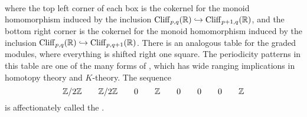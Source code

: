  \\\\\\
where the top left corner of each box is the cokernel for the monoid homomorphism
induced by the inclusion $\operatorname{Cliff}_{p,q}(\mathbb{R}) \hookrightarrow \operatorname{Cliff}_{p+1,q}(\mathbb{R})$,
and the bottom right  corner is the cokernel for the monoid homomorphism induced
by the inclusion $\operatorname{Cliff}_{p,q}(\mathbb{R}) \hookrightarrow \operatorname{Cliff}_{p,q+1}(\mathbb{R})$. There
is an analogous table for the graded modules, where everything is shifted right
one square. The periodicity patterns in this table are one of the many
forms of , which has wide ranging implications in homotopy
theory and $K$-theory. The sequence
\[
 \mathbb{Z}/2\mathbb{Z} \qquad \mathbb{Z}/2\mathbb{Z} \qquad 0 \qquad \mathbb{Z} \qquad 0 \qquad 0 \qquad 0 \qquad \mathbb{Z}
\]
is affectionately called the .
%
